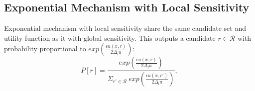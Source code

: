 \documentclass[sigconf, anonymous]{acmart}
\begin{document}



\subsection{Exponential Mechanism with Local Sensitivity}
\label{subsec_emls}
Exponential mechanism with local sensitivity share the same candidate set and utility function as it with global sensitivity. This outputs a candidate $r \in \mathcal{R}$ with probability proportional to $exp(\frac{\epsilon u(x,r)}{2 \Delta_{l}u})$:
\begin{equation*}
P[r] = \frac
{exp(\frac{\epsilon u(x,r)}{2 \Delta_{l}u})}
{\Sigma_{r' \in \mathcal{R}}\ exp(\frac{\epsilon u(x,r')}{2 \Delta_{l}u})},
\end{equation*}
\end{document}
